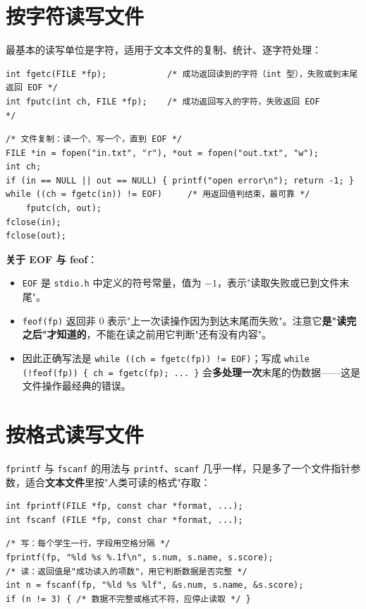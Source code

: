\section{按字符读写文件}
最基本的读写单位是字符，适用于文本文件的复制、统计、逐字符处理：
\begin{lstlisting}
int fgetc(FILE *fp);            /* 成功返回读到的字符（int 型），失败或到末尾返回 EOF */
int fputc(int ch, FILE *fp);    /* 成功返回写入的字符，失败返回 EOF               */
\end{lstlisting}

\begin{lstlisting}
/* 文件复制：读一个、写一个，直到 EOF */
FILE *in = fopen("in.txt", "r"), *out = fopen("out.txt", "w");
int ch;
if (in == NULL || out == NULL) { printf("open error\n"); return -1; }
while ((ch = fgetc(in)) != EOF)     /* 用返回值判结束，最可靠 */
    fputc(ch, out);
fclose(in);
fclose(out);
\end{lstlisting}

\textbf{关于 EOF 与 feof}：
\begin{itemize}
  \item \texttt{EOF} 是 \texttt{stdio.h} 中定义的符号常量，值为 $-1$，表示"读取失败或已到文件末尾"。
  \item \texttt{feof(fp)} 返回非 0 表示"上一次读操作因为到达末尾而失败"。注意它\textbf{是"读完之后"才知道的}，不能在读之前用它判断"还有没有内容"。
  \item 因此正确写法是 \texttt{while ((ch = fgetc(fp)) != EOF)}；写成 \texttt{while (!feof(fp)) \{ ch = fgetc(fp); ... \}} 会\textbf{多处理一次}末尾的伪数据——这是文件操作最经典的错误。
\end{itemize}

\section{按格式读写文件}
\texttt{fprintf} 与 \texttt{fscanf} 的用法与 \texttt{printf}、\texttt{scanf} 几乎一样，只是多了一个文件指针参数，适合\textbf{文本文件}里按"人类可读的格式"存取：
\begin{lstlisting}
int fprintf(FILE *fp, const char *format, ...);
int fscanf (FILE *fp, const char *format, ...);
\end{lstlisting}

\begin{lstlisting}
/* 写：每个学生一行，字段用空格分隔 */
fprintf(fp, "%ld %s %.1f\n", s.num, s.name, s.score);
/* 读：返回值是"成功读入的项数"，用它判断数据是否完整 */
int n = fscanf(fp, "%ld %s %lf", &s.num, s.name, &s.score);
if (n != 3) { /* 数据不完整或格式不符，应停止读取 */ }
\end{lstlisting}

